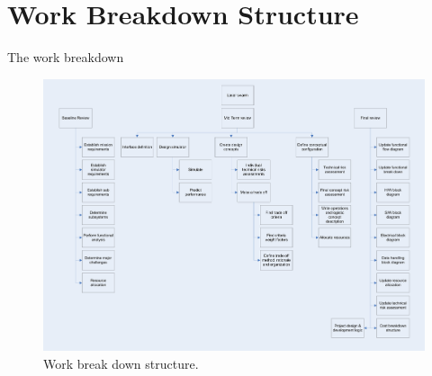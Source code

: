 \section{Work Breakdown Structure}
\label{dsePPWBS}
The work breakdown

\newpage
\begin{figure} [H]
\begin{center}
\includegraphics[width=1.2\textwidth, angle=90]{chapters/img/Work_break_down_structure.jpg}
\end{center}
\caption{Work break down structure.}
\end{figure}
